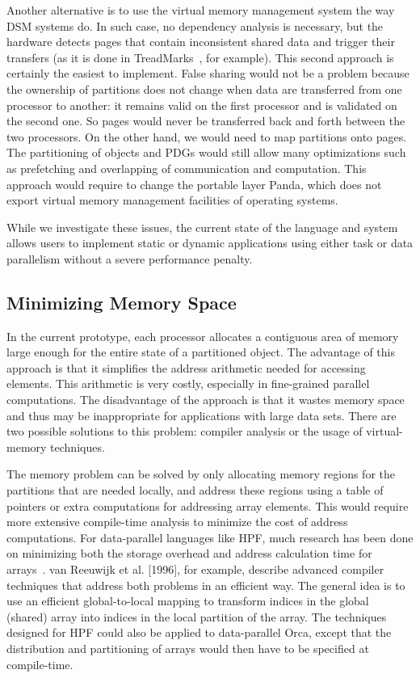 \documentclass{acmtrans2e}
\begin{document}
Another alternative is to use the virtual memory management system the
way DSM systems do. In such case, no dependency analysis is necessary,
but the hardware detects pages that contain inconsistent shared data
and trigger their transfers (as it is done in
TreadMarks~\cite{dwarkadas96}, for example). This second approach is
certainly the easiest to implement. False sharing would not be a
problem because the ownership of partitions does not change when data
are transferred from one processor to another: it remains valid on the
first processor and is validated on the second one. So pages would
never be transferred back and forth between the two processors. On the
other hand, we would need to map partitions onto pages. The
partitioning of objects and PDGs would still allow many optimizations
such as prefetching and overlapping of communication and computation.
This approach would require to change the portable layer Panda, which
does not export virtual memory management facilities of operating
systems.

While we investigate these issues, the current state of the language
and system allows users to implement static or dynamic applications
using either task or data parallelism without a severe performance
penalty.

\subsection{Minimizing Memory Space}

In the current prototype, each processor allocates a contiguous area
of memory large enough for the entire state of a partitioned object.
The advantage of this approach is that it simplifies the address
arithmetic needed for accessing elements. This arithmetic is very
costly, especially in fine-grained parallel computations.
The disadvantage of the approach is that it wastes memory space and thus
may be inappropriate for applications with large data sets. 
There are two possible solutions to this problem: compiler analysis
or the usage of virtual-memory techniques.

The memory problem can be solved by only allocating memory regions for
the partitions that are needed locally, and address these regions
using a table of pointers or extra computations for addressing array
elements. This would require more extensive compile-time analysis to
minimize the cost of address computations.
For data-parallel languages like HPF,
much research has been done on minimizing both the storage overhead
and address calculation time for arrays~\cite{chatterjee93,reeuwijk:1996}.
van Reeuwijk et al. [1996], for example,
describe advanced compiler techniques that address both problems
in an efficient way.
The general idea is to use an efficient global-to-local mapping to transform
indices in the global (shared) array into indices in the local partition
of the array. 
The techniques designed for HPF could also be applied to data-parallel Orca,
except that the distribution and partitioning of arrays would then
have to be specified at compile-time.
\end{document}
